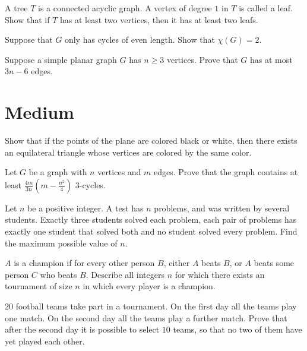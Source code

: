 \documentclass{article}
\begin{document}
\begin{exercise}
A tree $T$ is a connected acyclic graph. A vertex of degree $1$ in $T$ is called a leaf. Show that if $T$ has at least two vertices, then it has at least two leafs.  
\end{exercise}

\begin{exercise}
Suppose that $G$ only has cycles of even length. Show that $\chi(G) = 2$.
\end{exercise}

\begin{exercise}
Suppose a simple planar graph $G$ has $n \geq 3$ vertices. Prove that $G$ has at most $3n - 6$ edges. 
\end{exercise}

\section{Medium}
\begin{exercise}
Show that if the points of the plane are colored black or white, then there exists an equilateral triangle whose vertices are colored by the same color.
\end{exercise}

\begin{exercise}
Let $G$ be a graph with $n$ vertices and $m$ edges. Prove that the graph contains at least $\frac{4m}{3n}(m - \frac{n^{2}}{4})$ $3$-cycles.
\end{exercise}

\begin{exercise}
Let $n$ be a positive integer. A test has $n$ problems, and was written by several students. Exactly three students solved each problem, each pair of problems has exactly one student that solved both and no student solved every problem. Find the maximum possible value of $n$.
\end{exercise}

\begin{exercise}
$A$ is a champion if for every other person $B$, either $A$ beats $B$, or $A$ beats some person $C$ who beats $B$. Describe all integers $n$ for which there exists an tournament of size $n$ in which every player is a champion.
\end{exercise}

\begin{exercise}
$20$ football teams take part in a tournament. On the first day all the teams play one match. On the second day all the teams play a further match. Prove that after the second day it is possible to select $10$ teams, so that no two of them have yet played each other.
\end{exercise}
\end{document}
